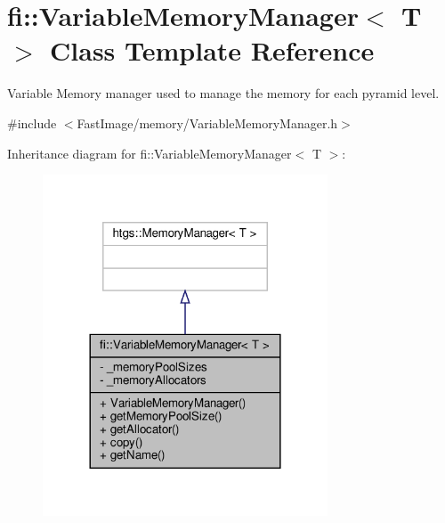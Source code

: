 \hypertarget{classfi_1_1VariableMemoryManager}{}\section{fi\+:\+:Variable\+Memory\+Manager$<$ T $>$ Class Template Reference}
\label{classfi_1_1VariableMemoryManager}


Variable Memory manager used to manage the memory for each pyramid level.  




{\ttfamily \#include $<$Fast\+Image/memory/\+Variable\+Memory\+Manager.\+h$>$}



Inheritance diagram for fi\+:\+:Variable\+Memory\+Manager$<$ T $>$\+:
\nopagebreak
\begin{figure}[H]
\begin{center}
\leavevmode
\includegraphics[width=240pt]{df/ddf/classfi_1_1VariableMemoryManager__inherit__graph}
\end{center}
\end{figure}


